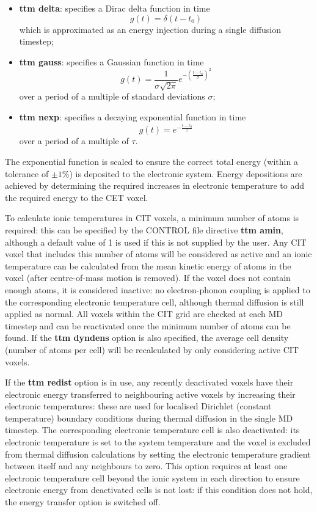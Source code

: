 \begin{itemize}
\item {\bf ttm delta}: specifies a Dirac delta function in time \begin{equation*} g(t) = \delta (t - t_0) \end{equation*} which is approximated as an energy injection during a single diffusion timestep;
\item {\bf ttm gauss}: specifies a Gaussian function in time \begin{equation*} g(t) = \frac{1}{\sigma\sqrt{2\pi}}e^{-\left(\frac{t-t_0}{\sigma}\right)^2} \end{equation*} over a period of a multiple of standard deviations $\sigma$;
\item {\bf ttm nexp}: specifies a decaying exponential function in time \begin{equation*} g(t) = e^{-\frac{t-t_0}{\tau}} \end{equation*} over a period of a multiple of $\tau$.
\end{itemize}
The exponential function is scaled to ensure the correct total energy 
(within a tolerance of $\pm 1$\%) is deposited to the electronic system. 
Energy depositions are achieved by determining the required increases 
in electronic temperature to add the required energy to the CET voxel.

To calculate ionic temperatures in CIT voxels, a minimum number of 
atoms is required: this can be specified by the CONTROL file directive 
{\bf ttm amin}, although a default value of 1 is used if this is not supplied 
by the user. Any CIT voxel that includes this number of atoms will be 
considered as active and an ionic temperature can be calculated from 
the mean kinetic energy of atoms in the voxel (after centre-of-mass 
motion is removed). If the voxel does not contain enough atoms, it is 
considered inactive: no electron-phonon coupling is applied to the 
corresponding electronic temperature cell, although thermal diffusion is 
still applied as normal. All voxels within the CIT grid are checked 
at each MD timestep and can be reactivated once the minimum number 
of atoms can be found. If the {\bf ttm dyndens} option is also specified,
the average cell density (number of atoms per cell) will be recalculated 
by only considering active CIT voxels.

If the {\bf ttm redist} option is in use, any recently deactivated voxels 
have their electronic energy transferred to neighbouring active voxels 
by increasing their electronic temperatures: these are used for localised 
Dirichlet (constant temperature) boundary conditions during thermal 
diffusion in the single MD timestep. The corresponding electronic 
temperature cell is also deactivated: its electronic temperature is set to 
the system temperature and the voxel is excluded from thermal diffusion 
calculations by setting the electronic temperature gradient between itself 
and any neighbours to zero. This option requires at least one electronic 
temperature cell beyond the ionic system in each direction to ensure 
electronic energy from deactivated cells is not lost: if this condition 
does not hold, the energy transfer option is switched off.


